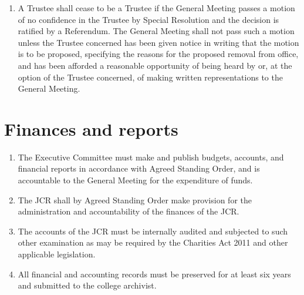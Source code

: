 \documentclass[11pt,a4paper, oneside]{memoir}
\begin{document}
\begin{enumerate}
\begin{enumerate}
	 	\end{enumerate}
	 	\item \label{Cl:TrusteeNoCon} A Trustee shall cease to be a Trustee if the General Meeting passes a motion of no confidence in the Trustee by Special Resolution and the decision is ratified by a Referendum.
	 	The General Meeting shall not pass such a motion unless the Trustee concerned has been given notice in writing that the motion is to be proposed, specifying the reasons for the proposed removal from office, and has been afforded a reasonable opportunity of being heard by or, at the option of the Trustee concerned, of making written representations to the General Meeting.
	 \end{enumerate}
	\section{Finances and reports} \label{Art:TrusteeFinances}
	\begin{enumerate}
		\item The Executive Committee must make and publish budgets, accounts, and financial reports in accordance with Agreed Standing Order, and is accountable to the General Meeting for the expenditure of funds. 
		\item The JCR shall by Agreed Standing Order make provision for the administration and accountability of the finances of the JCR.
		\item The accounts of the JCR must be internally audited and subjected to such other examination as may be required by the Charities Act 2011 and other applicable legislation.
		\item All financial and accounting records must be preserved for at least six years and submitted to the college archivist.
	\end{enumerate}
\end{document}
